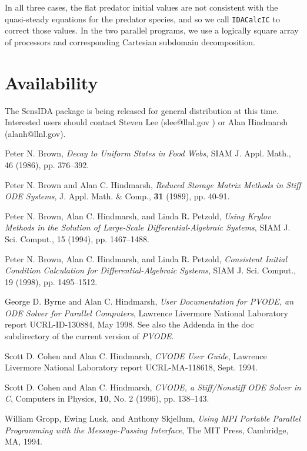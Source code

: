In all three cases, the flat predator initial values are not
consistent with the quasi-steady equations for the predator species,
and so we call {\tt IDACalcIC} to correct those values. 
In the two parallel programs, we use a logically square array of
processors and corresponding Cartesian subdomain decomposition.

\section{Availability}

The SensIDA package is being released for general distribution at
this time.
Interested users should contact Steven Lee (slee@llnl.gov ) or Alan
Hindmarsh (alanh@llnl.gov).

\begin{thebibliography}{99}

Peter N. Brown, {\em Decay to Uniform States in Food Webs}, SIAM
J. Appl. Math., 46 (1986), pp. 376--392.

 Peter N. Brown and Alan C. Hindmarsh, {\em Reduced Storage
Matrix Methods in Stiff ODE Systems}, J. Appl. Math. \& Comp., {\bf 31}
(1989), pp. 40-91.

Peter N. Brown, Alan C. Hindmarsh, and Linda R. Petzold, {\em Using Krylov
Methods in the Solution of Large-Scale Differential-Algebraic Systems}, 
SIAM J. Sci. Comput., 15 (1994), pp. 1467--1488.

Peter N. Brown, Alan C. Hindmarsh, and Linda R. Petzold, {\em Consistent
Initial Condition Calculation for Differential-Algebraic Systems}, 
SIAM J. Sci. Comput., 19 (1998), pp. 1495--1512.

 George D. Byrne and Alan C. Hindmarsh, {\it User
Documentation for PVODE, an ODE Solver for Parallel Computers},
Lawrence Livermore National Laboratory report UCRL-ID-130884, May 1998.
See also the Addenda in the doc subdirectory of the current version of
{\it PVODE}.

 Scott D. Cohen and Alan C. Hindmarsh, {\it CVODE User
Guide}, Lawrence Livermore National Laboratory report UCRL-MA-118618, Sept.
1994.

 Scott D. Cohen and Alan C. Hindmarsh, {\em CVODE, a
Stiff/Nonstiff ODE Solver in C}, Computers in Physics, {\bf 10}, No. 2
(1996), pp. 138--143.

  William Gropp, Ewing Lusk, and Anthony Skjellum, {\it Using
MPI Portable Parallel Programming with the Message-Passing Interface}, The
MIT Press, Cambridge, MA, 1994.


\end{thebibliography}
